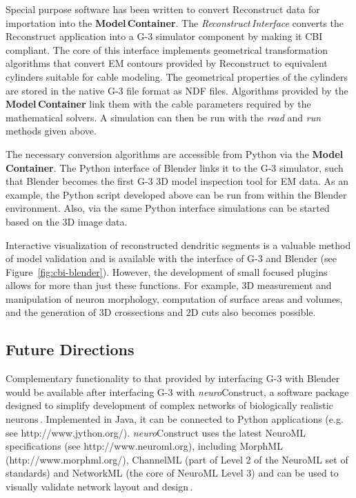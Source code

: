 \documentclass[12pt]{article}
\begin{document}
Special purpose software has been written to convert Reconstruct data
for importation into the {\bf Model\,Container}.  The {\it
  Reconstruct\,Interface} converts the Reconstruct application into a
G-3 simulator component by making it CBI compliant.
The core of this interface implements geometrical transformation
algorithms that convert EM contours provided by Reconstruct to
equivalent cylinders suitable for cable modeling.
The geometrical properties of the cylinders are stored in the native G-3 file format as NDF files. Algorithms provided by the {\bf Model\,Container} link them with
the cable parameters required by the mathematical solvers.  A
simulation can then be run with the {\it read} and {\it run} methods
given above.

The necessary conversion algorithms are accessible from Python via the
{\bf Model\,Container}.  The Python interface of Blender links it to the G-3
simulator, such that Blender becomes the first G-3 3D model inspection
tool for EM data.  As an example, the Python script developed above
can be run from within the Blender environment.  Also, via the same
Python interface simulations can be started based on the 3D image
data.

Interactive visualization of reconstructed dendritic segments is a
valuable method of model validation and is available with the
interface of G-3 and Blender (see Figure~\ref{fig:cbi-blender}).
However, the development of small focused plugins allows for more than
just these functions. For example, 3D measurement and manipulation of
neuron morphology, computation of surface areas and volumes, and the
generation of 3D crossections and 2D cuts also becomes possible.

\subsection{Future Directions}

Complementary functionality to that provided by interfacing G-3 with
Blender would be available after interfacing G-3 with {\it
  neuro}Construct, a software package designed to simplify development
of complex networks of biologically realistic
neurons\,\cite{gleeson05:_build_networ_model}.  Implemented in Java,
it can be connected to Python applications (e.g. see
http://www.jython.org/).  {\it neuro}Construct uses the latest NeuroML
specifications (see http://www.neuroml.org), including MorphML
(http://www.morphml.org/), ChannelML (part of Level 2 of the NeuroML
set of standards) and NetworkML (the core of NeuroML Level 3) and can
be used to visually validate network layout and
design\,\cite{crook07:_morph}.
\end{document}
